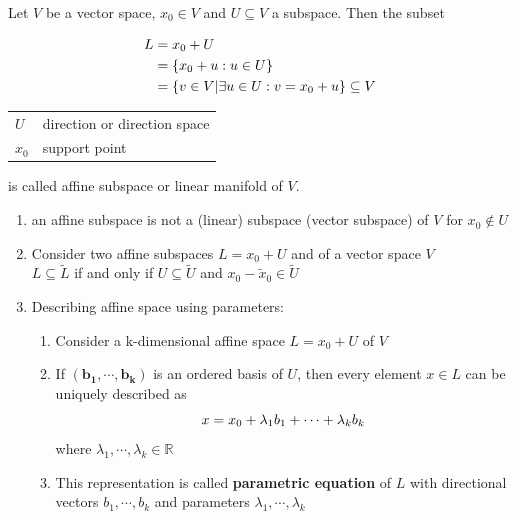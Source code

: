Let $V$ be a vector space, $x_0 \in V$ and $U \subseteq V$ a subspace. Then the subset

\begin{table}[h]
    \begin{minipage}{0.49\linewidth}
        \[
        \begin{aligned}
            L &= x_0 + U\\
             &= \left\{x_0 + u : u \in U\right\} \\
             &= \left\{v \in V | \exists u \in U : v = x_0 + u\right\} \subseteq V
        \end{aligned}
        \]
    \end{minipage}
    \hfill
    \begin{minipage}{0.49\linewidth}
        \begin{table}[H]
            \begin{tabular}{l l}
                $U$ & direction or direction space \\
                $x_0$ & support point \\
            \end{tabular}
        \end{table}
    \end{minipage}
\end{table}

is called affine subspace or linear manifold of $V$. 


\begin{enumerate}
    \item an affine subspace is not a (linear) subspace (vector subspace) of $V$ for $x_0 \not\in U$

    \item Consider two affine subspaces $L = x_0 + U$ and  of a vector space $V$\\
    $L \subseteq \tilde{L}$ if and only if $U \subseteq \tilde{U}$ and $x_0 - \tilde{x}_0 \in \tilde{U}$
    
    \item Describing affine space using parameters:
    \begin{enumerate}
        \item Consider a k-dimensional affine space $L = x_0 + U$ of $V$

        \item If $\mathbf{(b_1, \cdots , b_k)}$ is an ordered basis of $U$, then every element $x \in L$ can be uniquely described as
        \[
            \hfill 
            x = x_0 + \lambda_1b_1 + \cdots + \lambda_kb_k 
            \hfill
        \]
        where $\lambda_1, \cdots , \lambda_k \in \mathbb{R}$

        \item This representation is called \textbf{parametric equation} of $L$ with directional vectors $b_1, \cdots , b_k$ and parameters $\lambda_1, \cdots , \lambda_k$
        
    \end{enumerate}
    
\end{enumerate}


